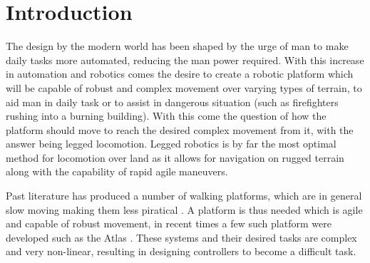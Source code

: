 \chapter{Introduction} \label{intro}
The design by the modern world has been shaped by the urge of man to make daily tasks more automated, reducing the man power required. With this increase in automation and robotics comes the desire to create a robotic platform which will be capable of robust and complex movement over varying types of terrain, to aid man in daily task or to assist in dangerous situation (such as firefighters rushing into a burning building). With this come the question of how the platform should move to reach the desired complex movement from it, with the answer being legged locomotion. Legged robotics is by far the most optimal method for locomotion over land as it allows for navigation on rugged terrain along with the capability of rapid agile maneuvers.

Past literature has produced a number of walking platforms, which are in general slow moving making them less piratical \cite{Asimo-2018}. A platform is thus needed which is agile and capable of robust movement, in recent times a few such platform were developed such as the Atlas \cite{Atlas-2019}. These systems and their desired tasks are complex and very non-linear, resulting in designing controllers to become a difficult task.

